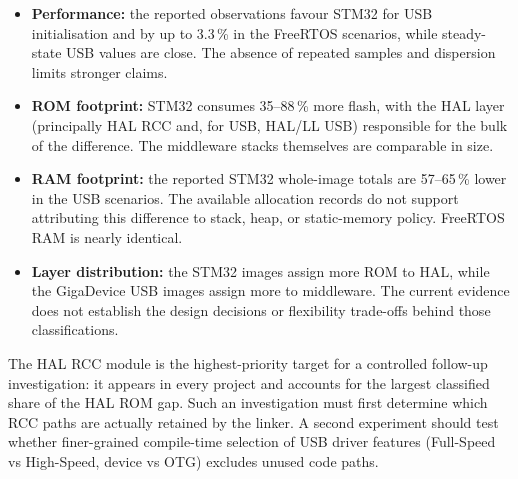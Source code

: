 \begin{itemize}
  \item \textbf{Performance:} the reported observations favour STM32 for USB
    initialisation and by up to 3.3\,\% in the FreeRTOS scenarios, while steady-state USB
    values are close. The absence of repeated samples and dispersion limits stronger claims.
  \item \textbf{ROM footprint:} STM32 consumes 35--88\,\% more flash, with the HAL layer
    (principally HAL RCC and, for USB, HAL/LL USB) responsible for the bulk of the
    difference. The middleware stacks themselves are comparable in size.
  \item \textbf{RAM footprint:} the reported STM32 whole-image totals are 57--65\,\% lower
    in the USB scenarios. The available allocation records do not support attributing this
    difference to stack, heap, or static-memory policy. FreeRTOS RAM is nearly identical.
  \item \textbf{Layer distribution:} the STM32 images assign more ROM to HAL, while the
    GigaDevice USB images assign more to middleware. The current evidence does not establish
    the design decisions or flexibility trade-offs behind those classifications.
\end{itemize}

The HAL RCC module is the highest-priority target for a controlled follow-up investigation:
it appears in every project and accounts for the largest classified share of the HAL ROM
gap. Such an investigation must first determine which RCC paths are actually retained by
the linker. A second experiment should test whether finer-grained compile-time selection of
USB driver features (Full-Speed vs High-Speed, device vs OTG) excludes unused code paths.

\pagebreak